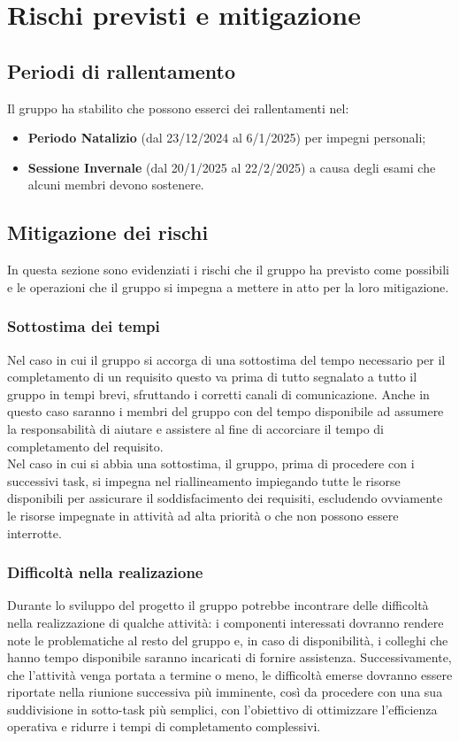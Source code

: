\section{Rischi previsti e mitigazione}
\subsection{Periodi di rallentamento}
Il gruppo ha stabilito che possono esserci dei rallentamenti nel:
\begin{itemize}
    \item \textbf{Periodo Natalizio} (dal 23/12/2024 al 6/1/2025) per impegni personali;
    \item \textbf{Sessione Invernale} (dal 20/1/2025 al 22/2/2025) a causa degli esami che alcuni membri devono sostenere.
\end{itemize}
\subsection{Mitigazione dei rischi}
In questa sezione sono evidenziati i rischi che il gruppo ha previsto come possibili e le operazioni che il gruppo si impegna a mettere in atto per la loro mitigazione.

\subsubsection{Sottostima dei tempi}
Nel caso in cui il gruppo si accorga di una sottostima del tempo necessario per il completamento di un requisito questo va prima di tutto segnalato a tutto il gruppo in tempi brevi, sfruttando i corretti canali di comunicazione. Anche in questo caso saranno i membri del gruppo con del tempo disponibile ad assumere la responsabilità di aiutare e assistere al fine di accorciare il tempo di completamento del requisito.
\\
Nel caso in cui si abbia una sottostima, il gruppo, prima di procedere con i successivi task, si impegna nel riallineamento impiegando tutte le risorse disponibili per assicurare il soddisfacimento dei requisiti, escludendo ovviamente le risorse impegnate in attività ad alta priorità o che non possono essere interrotte.


\subsubsection{Difficoltà nella realizazione}
Durante lo sviluppo del progetto il gruppo potrebbe incontrare delle difficoltà nella realizzazione di qualche attività: i componenti interessati dovranno rendere note le problematiche al resto del gruppo e, in caso di disponibilità, i colleghi che hanno tempo disponibile saranno incaricati di fornire assistenza.
Successivamente, che l’attività venga portata a termine o meno, le difficoltà emerse dovranno essere riportate nella riunione successiva più imminente, così da procedere con una sua suddivisione in sotto-task più semplici, con l'obiettivo di ottimizzare l’efficienza operativa e ridurre i tempi di completamento complessivi.

